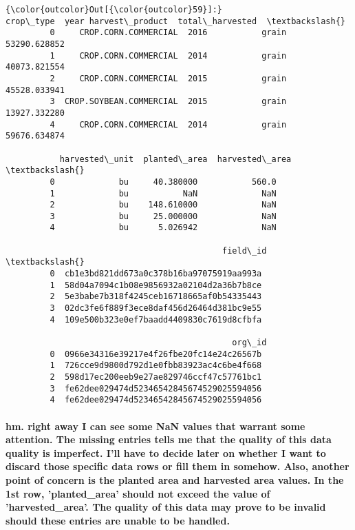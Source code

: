 \documentclass[11pt]{article}
\begin{document}
\begin{Verbatim}[commandchars=\\\{\}]
{\color{outcolor}Out[{\color{outcolor}59}]:}                  crop\_type  year harvest\_product  total\_harvested  \textbackslash{}
         0     CROP.CORN.COMMERCIAL  2016           grain     53290.628852   
         1     CROP.CORN.COMMERCIAL  2014           grain     40073.821554   
         2     CROP.CORN.COMMERCIAL  2015           grain     45528.033941   
         3  CROP.SOYBEAN.COMMERCIAL  2015           grain     13927.332280   
         4     CROP.CORN.COMMERCIAL  2014           grain     59676.634874   
         
           harvested\_unit  planted\_area  harvested\_area  \textbackslash{}
         0             bu     40.380000           560.0   
         1             bu           NaN             NaN   
         2             bu    148.610000             NaN   
         3             bu     25.000000             NaN   
         4             bu      5.026942             NaN   
         
                                            field\_id  \textbackslash{}
         0  cb1e3bd821dd673a0c378b16ba97075919aa993a   
         1  58d04a7094c1b08e9856932a02104d2a36b7b8ce   
         2  5e3babe7b318f4245ceb16718665af0b54335443   
         3  02dc3fe6f889f3ece8daf456d26464d381bc9e55   
         4  109e500b323e0ef7baadd4409830c7619d8cfbfa   
         
                                              org\_id  
         0  0966e34316e39217e4f26fbe20fc14e24c26567b  
         1  726cce9d9800d792d1e0fbb83923ac4c6be4f668  
         2  598d17ec200eeb9e27ae829746ccf47c57761bc1  
         3  fe62dee029474d52346542845674529025594056  
         4  fe62dee029474d52346542845674529025594056  
\end{Verbatim}
            
    \paragraph{hm. right away I can see some NaN values that warrant some
attention. The missing entries tells me that the quality of this data
quality is imperfect. I'll have to decide later on whether I want to
discard those specific data rows or fill them in somehow. Also, another
point of concern is the planted area and harvested area values. In the
1st row, 'planted\_area' should not exceed the value of
'harvested\_area'. The quality of this data may prove to be invalid
should these entries are unable to be
handled.}\label{hm.-right-away-i-can-see-some-nan-values-that-warrant-some-attention.-the-missing-entries-tells-me-that-the-quality-of-this-data-quality-is-imperfect.-ill-have-to-decide-later-on-whether-i-want-to-discard-those-specific-data-rows-or-fill-them-in-somehow.-also-another-point-of-concern-is-the-planted-area-and-harvested-area-values.-in-the-1st-row-planted_area-should-not-exceed-the-value-of-harvested_area.-the-quality-of-this-data-may-prove-to-be-invalid-should-these-entries-are-unable-to-be-handled.}
\end{document}
